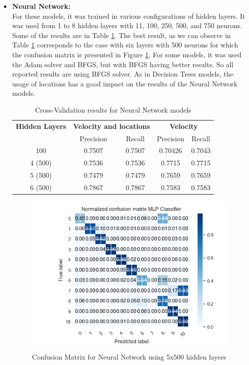 \begin{itemize}
\newpage
\item \textbf{Neural Network: }\\
For these models, it was trained in various configurations of hidden layers. It was used from 1 to 8 hidden layers with 11, 100, 250, 500, and 750 neurons. Some of the results are in Table \ref{table:cross_val_nn}. The best result, as we can observe in Table \ref{table:cross_val_nn} corresponds to the case with six layers with 500 neurons for which the confusion matrix is presented in Figure \ref{fig:cm_nn}.
For some models, it was used the Adam solver and BFGS, but with BFGS having better results. So all reported results are using BFGS solver.
As in Decision Trees models, the usage of locations has a good impact on the results of the Neural Network models.


\begin {table}[H]
\caption {Cross-Validation results for Neural Network models}
\begin{center}
\begin{tabular}{c|c|c|c|c}
\multicolumn{1}{c|}{\textbf{Hidden Layers } } &\multicolumn{2}{c|}{\textbf{ Velocity and locations}}& \multicolumn{2}{c}{\textbf{ Velocity}}\\
&Precision & Recall & Precision & Recall \\
\hline
100 &0.7507&0.7507&0.70426 &0.7043\\
4 (500) &0.7536&0.7536&0.7715& 0.7715\\
5 (500) &0.7479&0.7479&0.7659& 0.7659\\
6 (500) &0.7867&0.7867&0.7583&0.7583
\label{table:cross_val_nn}
\end{tabular}
\end{center}
\end {table}


\begin{figure}[h]
\centering
\includegraphics[width=0.8\linewidth]{Chapters/img/CM_NN.png}
\caption{Confusion Matrix for Neural Network using 5x500 hidden layers}
\label{fig:cm_nn}
\end{figure}



\end{itemize}
